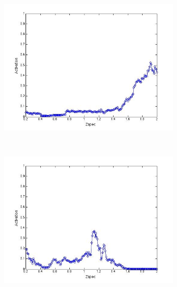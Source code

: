 \documentclass[useAMS,usenatbib,fleqn]{mn2e}
\begin{document}
\begin{figure}
\begin{subfigure}[b]{0.075\textwidth}
                \includegraphics[trim = 35px 15px 50px 25px, clip=true,width=\textwidth]{activation_03.jpg}
        \end{subfigure}
        ~
        \begin{subfigure}[b]{0.075\textwidth}
                \includegraphics[trim = 35px 15px 50px 25px, clip=true,width=\textwidth]{activation_04.jpg}
        \end{subfigure}
        ~
        \begin{subfigure}[b]{0.075\textwidth}

\end{subfigure}
\end{figure}
\end{document}
